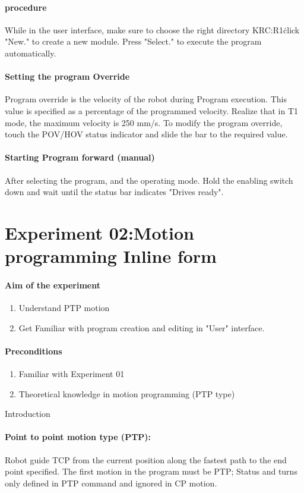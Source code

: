 \documentclass[]{book}
\begin{document}
\paragraph{procedure}
While in the user interface, make sure to choose the right directory KRC:R1\.click "New." to create a new module. 
Press "Select." to execute the program automatically.

\paragraph{Setting the program Override}
Program override is the velocity of the robot during Program execution. This value is specified as a percentage of the programmed velocity. Realize that in T1 mode, the maximum velocity is 250 mm/s. To modify the program override, touch the POV/HOV status indicator and slide the bar to the required value.
\paragraph{Starting Program forward (manual)}
After selecting the program, and the operating mode. Hold the enabling switch down and wait until the status bar indicates "Drives ready".
\section{Experiment 02:Motion programming Inline form}
\paragraph{Aim of the experiment}
\begin{enumerate}
	\item Understand PTP motion
	\item Get Familiar with program creation and editing in "User" interface.
\end{enumerate}
\paragraph{Preconditions}
\begin{enumerate}
	\item Familiar with Experiment 01
	\item Theoretical knowledge in motion programming (PTP type) 
\end{enumerate}
Introduction
\paragraph{Point to point motion type (PTP):}
Robot guide TCP from the current position along the fastest path to the end point specified. 
The first motion in the program must be PTP; Status and turns only defined in PTP command and ignored in CP motion.
\end{document}
